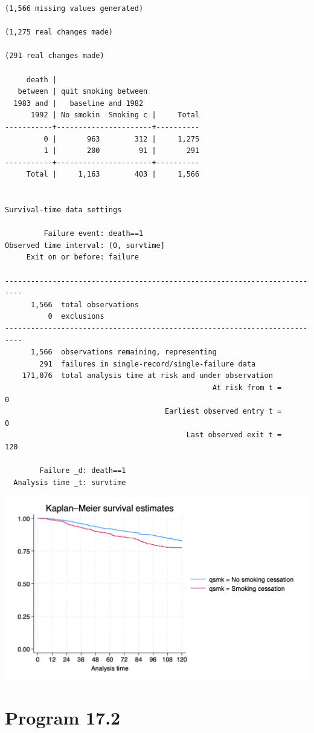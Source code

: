 \documentclass[
  10pt,
  a4paper,
]{book}
\begin{document}
\begin{verbatim}
(1,566 missing values generated)

(1,275 real changes made)

(291 real changes made)

     death |
   between | quit smoking between
  1983 and |   baseline and 1982
      1992 | No smokin  Smoking c |     Total
-----------+----------------------+----------
         0 |       963        312 |     1,275 
         1 |       200         91 |       291 
-----------+----------------------+----------
     Total |     1,163        403 |     1,566 


Survival-time data settings

         Failure event: death==1
Observed time interval: (0, survtime]
     Exit on or before: failure

--------------------------------------------------------------------------
      1,566  total observations
          0  exclusions
--------------------------------------------------------------------------
      1,566  observations remaining, representing
        291  failures in single-record/single-failure data
    171,076  total analysis time at risk and under observation
                                                At risk from t =         0
                                     Earliest observed entry t =         0
                                          Last observed exit t =       120

        Failure _d: death==1
  Analysis time _t: survtime
\end{verbatim}

\begin{center}\includegraphics[width=0.85\linewidth]{./figs/stata-fig-17-1} \end{center}

\section{Program 17.2}\label{program-17.2-1}
\end{document}
